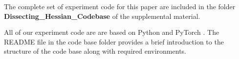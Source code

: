 \label{sec:app_codes}



The complete set of experiment code for this paper are included in the folder \textbf{Dissecting\_Hessian\_Codebase} of the supplemental material.

All of our experiment code are are based on Python and PyTorch \citep{NEURIPS2019_9015}. The README file in the code base folder provides a brief introduction to the structure of the code base along with required environments.




